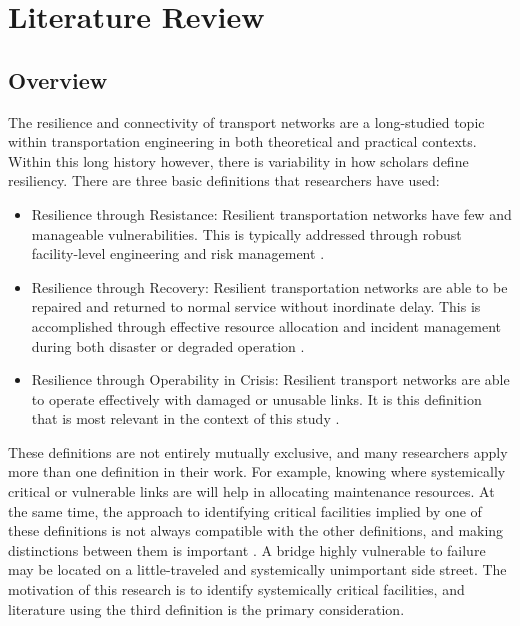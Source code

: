 \chapter{Literature Review}
\label{chp:chapter2}
\graphicspath{{figures/}{figures/chapter2/}}

\section{Overview}

The resilience and connectivity of transport networks are a long-studied
topic within
transportation engineering in both theoretical and practical contexts.
Within this long history
however, there is variability in how scholars define resiliency. There are
three basic
definitions that researchers have used:

\begin{itemize}
	\item Resilience through Resistance: Resilient transportation networks
	have few and manageable vulnerabilities. This is typically addressed
	through robust facility-level engineering and risk management
	\citep{bradley2007, peeta2010}.
	\item Resilience through Recovery: Resilient transportation networks are
	able to be repaired and returned to normal service without inordinate
	delay. This is accomplished through effective resource allocation and
	incident management during both disaster or degraded operation
	\citep{zhang2016}.
	\item Resilience through Operability in Crisis: Resilient transport
	networks are able to operate effectively with damaged or unusable links.
	It is this definition that is most relevant in the context of this study
	\citep{berdica2002, ip2011}.
\end{itemize}

These definitions are not entirely mutually exclusive, and many
researchers apply more than one
definition in their work. For example, knowing where systemically critical
or vulnerable links
are will help in allocating maintenance resources. At the same time, the
approach to identifying
critical facilities implied by one of these definitions is not always
compatible with the other
definitions, and making distinctions between them is important
\citep{rogers2012}. A bridge
highly vulnerable to failure may be located on a little-traveled and
systemically unimportant
side street. The motivation of this research is to identify systemically
critical facilities, and literature using the third definition is the primary consideration.

